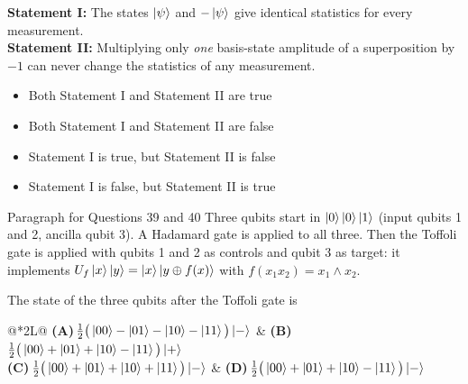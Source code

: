 \documentclass[11pt,a4paper]{article}
\newcommand{\optlabel}[1]{\textbf{(#1)}}
\newenvironment{qitem}[1]{\begin{list}{}{\setlength{\leftmargin}{3.3em}\setlength{\labelwidth}{3.1em}%
  \setlength{\labelsep}{0.2em}\setlength{\topsep}{3pt}\setlength{\parsep}{3pt}}\item[\textbf{Q.#1}\hfill]}{\end{list}}
\newcommand{\qsep}{\par\vspace{2pt}{\color{black!15}\hrule}\vspace{4pt}}
\begin{document}
\begin{qitem}{38}
\textbf{Statement I:} The states $\ket\psi$ and $-\ket\psi$ give identical statistics for every measurement.\\[1mm]
\textbf{Statement II:} Multiplying only \emph{one} basis-state amplitude of a superposition by $-1$ can never change the statistics of any measurement.
\begin{itemize}[leftmargin=2.6em, labelsep=0.4em, itemsep=2pt, topsep=3pt]
\item[\optlabel{A}] Both Statement I and Statement II are true
\item[\optlabel{B}] Both Statement I and Statement II are false
\item[\optlabel{C}] Statement I is true, but Statement II is false
\item[\optlabel{D}] Statement I is false, but Statement II is true
\end{itemize}
\end{qitem}
\qsep

\begin{passagebox}{Paragraph for Questions 39 and 40}
Three qubits start in $\ket{0}\ket{0}\ket{1}$ (input qubits 1 and 2, ancilla qubit 3). A Hadamard gate is applied to all three. Then the
Toffoli gate is applied with qubits 1 and 2 as controls and qubit 3 as target: it implements
$U_f\ket{x}\ket{y} = \ket{x}\ket{y \oplus f(x)}$ with $f(x_1x_2) = x_1 \land x_2$.
\end{passagebox}
\begin{qitem}{39}
The state of the three qubits after the Toffoli gate is
\par\smallskip\noindent\begin{tabularx}{\linewidth}{@{}*{2}{L}@{}}
\optlabel{A}\,$\frac12\big(\ket{00} - \ket{01} - \ket{10} - \ket{11}\big)\ket{-}$ & \optlabel{B}\,$\frac12\big(\ket{00} + \ket{01} + \ket{10} - \ket{11}\big)\ket{+}$ \\[3pt]
\optlabel{C}\,$\frac12\big(\ket{00} + \ket{01} + \ket{10} + \ket{11}\big)\ket{-}$ & \optlabel{D}\,$\frac12\big(\ket{00} + \ket{01} + \ket{10} - \ket{11}\big)\ket{-}$
\end{tabularx}
\end{qitem}
\qsep
\end{document}
